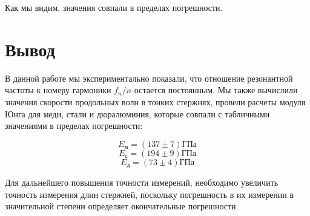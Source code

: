 \documentclass[a4paper, 12pt]{article}
\begin{document}
    Как мы видим, значения совпали в пределах погрешности.

    \section{Вывод}

    В данной работе мы экспериментально показали, что отношение резонантной частоты к номеру гармоники $f_n/n$ остается постоянным. Мы также вычислили значения скорости продольных волн в тонких стержнях, провели расчеты модуля Юнга для меди, стали и дюралюминия, которые совпали с табличными значениями в пределах погрешности:

    $$E_м = (137 \pm 7) ГПа$$
    $$E_с = (194 \pm 9) ГПа$$
    $$E_д = (73 \pm 4) ГПа$$

    Для дальнейшего повышения точности измерений, необходимо увеличить точность измерения длин стержней, поскольку погрешность в их измерении в значительной степени определяет окончательные погрешности.
    
\end{document}
